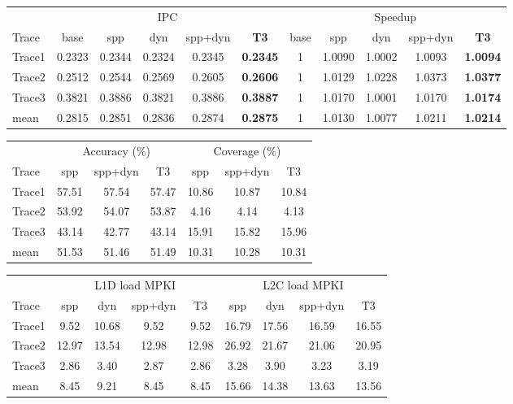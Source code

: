 \documentclass[12pt]{report}
\begin{document}
\begin{table}[H]\centering\small
\begin{tabular}{l ccccc ccccc}
\toprule
& \multicolumn{5}{c}{IPC} & \multicolumn{5}{c}{Speedup}\\
\cmidrule(lr){2-6}\cmidrule(lr){7-11}
Trace & base & spp & dyn & spp+dyn & \textbf{T3} & base & spp & dyn & spp+dyn & \textbf{T3}\\
\midrule
Trace1 & 0.2323 & 0.2344 & 0.2324 & 0.2345 & \textbf{0.2345} & 1 & 1.0090 & 1.0002 & 1.0093 & \textbf{1.0094}\\
Trace2 & 0.2512 & 0.2544 & 0.2569 & 0.2605 & \textbf{0.2606} & 1 & 1.0129 & 1.0228 & 1.0373 & \textbf{1.0377}\\
Trace3 & 0.3821 & 0.3886 & 0.3821 & 0.3886 & \textbf{0.3887} & 1 & 1.0170 & 1.0001 & 1.0170 & \textbf{1.0174}\\
mean   & 0.2815 & 0.2851 & 0.2836 & 0.2874 & \textbf{0.2875} & 1 & 1.0130 & 1.0077 & 1.0211 & \textbf{1.0214}\\
\bottomrule
\end{tabular}

\vspace{0.6em}
\begin{tabular}{l ccc ccc}
\toprule
& \multicolumn{3}{c}{Accuracy (\%)} & \multicolumn{3}{c}{Coverage (\%)}\\
\cmidrule(lr){2-4}\cmidrule(lr){5-7}
Trace & spp & spp+dyn & T3 & spp & spp+dyn & T3\\
\midrule
Trace1 & 57.51 & 57.54 & 57.47 & 10.86 & 10.87 & 10.84\\
Trace2 & 53.92 & 54.07 & 53.87 & 4.16 & 4.14 & 4.13\\
Trace3 & 43.14 & 42.77 & 43.14 & 15.91 & 15.82 & 15.96\\
mean   & 51.53 & 51.46 & 51.49 & 10.31 & 10.28 & 10.31\\
\bottomrule
\end{tabular}

\vspace{0.6em}
\begin{tabular}{l cccc cccc}
\toprule
& \multicolumn{4}{c}{L1D load MPKI} & \multicolumn{4}{c}{L2C load MPKI}\\
\cmidrule(lr){2-5}\cmidrule(lr){6-9}
Trace & spp & dyn & spp+dyn & T3 & spp & dyn & spp+dyn & T3\\
\midrule
Trace1 & 9.52 & 10.68 & 9.52 & 9.52 & 16.79 & 17.56 & 16.59 & 16.55\\
Trace2 & 12.97 & 13.54 & 12.98 & 12.98 & 26.92 & 21.67 & 21.06 & 20.95\\
Trace3 & 2.86 & 3.40 & 2.87 & 2.86 & 3.28 & 3.90 & 3.23 & 3.19\\
mean   & 8.45 & 9.21 & 8.45 & 8.45 & 15.66 & 14.38 & 13.63 & 13.56\\
\bottomrule
\end{tabular}


\end{table}
\end{document}
